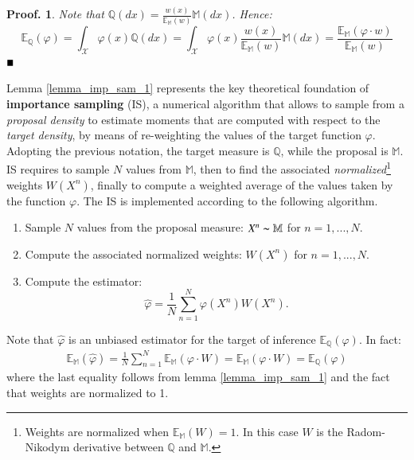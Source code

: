 \documentclass[
]{book}
\theoremstyle{break}
\theoremstyle{nonumberplain}
\newtheorem{proof*}{Proof.}
\begin{document}
\begin{proof*}
Note that $\mathbb Q(dx)=\frac{w(x)}{\mathbb E_\mathbb M(w)}\mathbb M(dx)$. Hence:
\begin{equation*}
    \mathbb E_\mathbb Q(\varphi)=\int_\mathcal X\varphi(x)\mathbb Q(dx)=\int_\mathcal X\varphi(x)\frac{w(x)}{\mathbb E_\mathbb M(w)}\mathbb M(dx)=\frac{\mathbb E_\mathbb M(\varphi \cdot w)}{\mathbb E_\mathbb M(w)}
\end{equation*}
$\hfill\blacksquare$
\end{proof*}

Lemma \ref{lemma_imp_sam_1} represents the key theoretical foundation of
\textbf{importance sampling} (IS), a numerical algorithm that allows to
sample from a \textit{proposal density} to estimate moments that are
computed with respect to the \textit{target density}, by means of
re-weighting the values of the target function \(\varphi\).\\
Adopting the previous notation, the target measure is \(\mathbb Q\),
while the proposal is \(\mathbb M\). IS requires to sample \(N\) values
from \(\mathbb M\), then to find the associated
\textit{normalized}\footnote{Weights are normalized when $\mathbb E_\mathbb M(W)=1$. In this case $W$ is the Radom-Nikodym derivative between $\mathbb Q$ and $\mathbb M$.}
weights \(W(X^n)\), finally to compute a weighted average of the values
taken by the function \(\varphi\). The IS is implemented according to
the following algorithm.

\begin{enumerate}
    \item Sample $N$ values from the proposal measure: $X^n\thicksim \mathbb M$ for $n=1,...,N$.
    \item Compute the associated normalized weights: $W(X^n)$ for $n=1,...,N$.
    \item Compute the estimator:
    \begin{equation*}
        \hat \varphi= \frac{1}{N} \sum_{n=1}^N\varphi (X^n)W(X^n).
    \end{equation*}
\end{enumerate}

Note that \(\hat \varphi\) is an unbiased estimator for the target of
inference \(\mathbb E_\mathbb Q(\varphi)\). In fact: \begin{equation*}
    \begin{split}
        \mathbb E_\mathbb M(\hat \varphi)=\frac{1}{N} \sum_{n=1}^N \mathbb E_\mathbb M(\varphi \cdot W)=\mathbb E_\mathbb M(\varphi \cdot W)=\mathbb E_\mathbb Q(\varphi)
    \end{split}
\end{equation*} where the last equality follows from lemma
\ref{lemma_imp_sam_1} and the fact that weights are normalized to 1.
\end{document}
